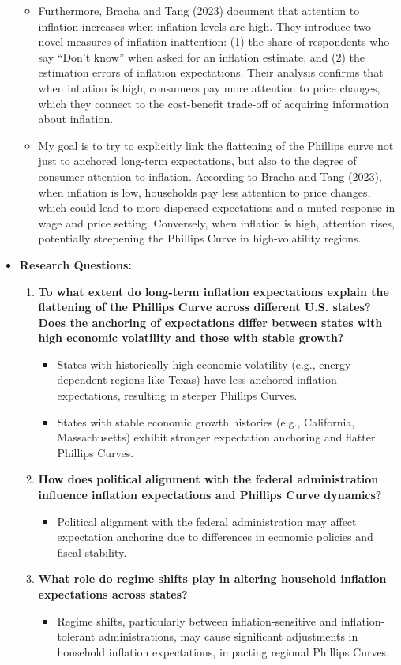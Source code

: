 \documentclass[10pt]{article}
\begin{document}
\begin{itemize}
\begin{itemize}
\item Furthermore, Bracha and Tang (2023) document that attention to inflation increases when inflation levels are high. They introduce two novel measures of inflation inattention: (1) the share of respondents who say ``Don't know'' when asked for an inflation estimate, and (2) the estimation errors of inflation expectations. Their analysis confirms that when inflation is high, consumers pay more attention to price changes, which they connect to the cost-benefit trade-off of acquiring information about inflation. 

\item My goal is to try to explicitly link the flattening of the Phillips curve not just to anchored long-term expectations, but also to the degree of consumer attention to inflation. According to Bracha and Tang (2023), when inflation is low, households pay less attention to price changes, which could lead to more dispersed expectations and a muted response in wage and price setting. Conversely, when inflation is high, attention rises, potentially steepening the Phillips Curve in high-volatility regions. 
\end{itemize}

\item \textbf{Research Questions:}
\begin{enumerate}
\item \textbf{To what extent do long-term inflation expectations explain the flattening of the Phillips Curve across different U.S. states? Does the anchoring of expectations differ between states with high economic volatility and those with stable growth?}
\begin{itemize}
\item States with historically high economic volatility (e.g., energy-dependent regions like Texas) have less-anchored inflation expectations, resulting in steeper Phillips Curves.
\item States with stable economic growth histories (e.g., California, Massachusetts) exhibit stronger expectation anchoring and flatter Phillips Curves.
\end{itemize}
\item \textbf{How does political alignment with the federal administration influence inflation expectations and Phillips Curve dynamics?}
\begin{itemize}
    \item Political alignment with the federal administration may affect expectation anchoring due to differences in economic policies and fiscal stability.
\end{itemize}
\item \textbf{What role do regime shifts play in altering household inflation expectations across states?}
\begin{itemize}
    \item Regime shifts, particularly between inflation-sensitive and inflation-tolerant administrations, may cause significant adjustments in household inflation expectations, impacting regional Phillips Curves.
\end{itemize}
\end{enumerate}




\end{itemize}
\end{document}
